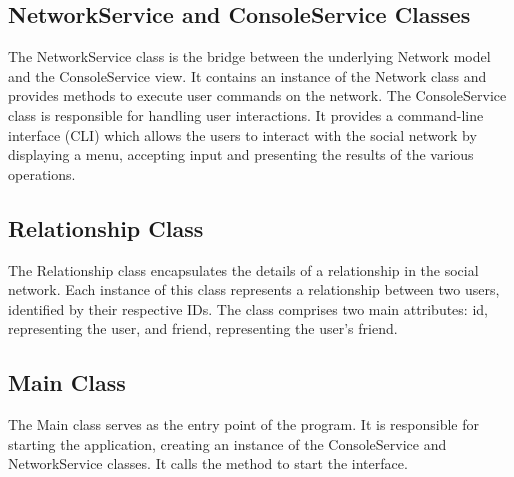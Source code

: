 \subsection*{NetworkService and ConsoleService Classes}
The NetworkService class is the bridge between the underlying Network model and the ConsoleService view. It contains an instance of the Network class and provides methods to execute user commands on the network. The ConsoleService class is responsible for handling user interactions. It provides a command-line interface (CLI) which allows the users to interact with the social network by displaying a menu, accepting input and presenting the results of the various operations.

\subsection*{Relationship Class}

The Relationship class encapsulates the details of a relationship in the social network. Each instance of this class represents a relationship between two users, identified by their respective IDs. The class comprises two main attributes: id, representing the user, and friend, representing the user's friend.

\subsection*{Main Class}
The Main class serves as the entry point of the program. It is responsible for starting the application, creating an instance of the ConsoleService and NetworkService classes. It calls the method to start the interface.